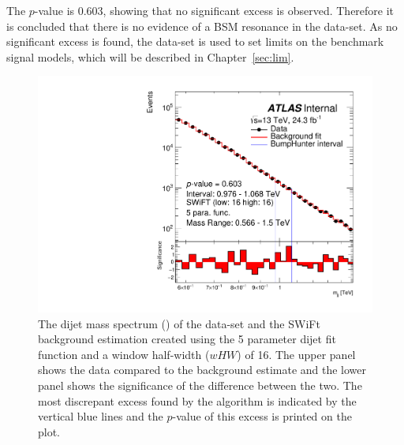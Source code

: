 The \bh{} $p$-value is 0.603, showing that no significant excess is observed.
Therefore it is concluded that there is no evidence of a BSM resonance in the \lm{} data-set.
As no significant excess is found, the \lm{} data-set is used to set limits on the benchmark signal models,
which will be described in Chapter~\ref{sec:lim}.

\begin{figure}[!thb]
\captionsetup[subfigure]{aboveskip=0pt,justification=centering}
\centering
  \includegraphics[width=0.7\linewidth, angle=0]{figs/Dibjet/LowMass/FitStudy_min566/bhFit_unblind_5para_low16_high16.pdf}
\vspace{3pt}
\caption[The dijet mass spectrum of the \lm{} data-set and the SWiFt background estimation.
        The most discrepant excess found by the \bh{} algorithm and the associated \mbox{$p$-value} are shown.]
        {\label{fig:bhFit_lm_unblind}
   The dijet mass spectrum (\mjj) of the \lm{} data-set and the SWiFt background estimation
   created using the 5 parameter dijet fit function and a window half-width ($wHW$) of 16. 
   The upper panel shows the data compared to the background estimate and the lower panel shows the significance of the difference between the two.
   The most discrepant excess found by the \bh{} algorithm is indicated by the vertical blue lines and the \mbox{$p$-value} of this excess is printed on the plot. }
\end{figure}




